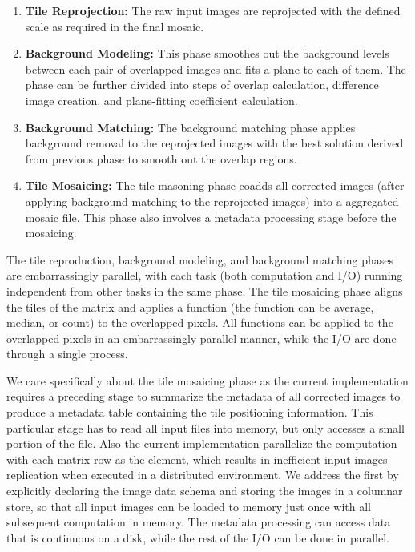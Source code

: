 \documentclass{acm_proc_article-sp}
\begin{document}
\begin{enumerate}
\item \textbf{Tile Reprojection:} The raw input images are reprojected with the defined scale as required in the
final mosaic. 
\item \textbf{Background Modeling:} This phase smoothes out the background levels between each pair of
overlapped images and fits a plane to each of them. The phase can be further divided into steps of overlap
calculation, difference image creation, and plane-fitting coefficient calculation.
\item \textbf{Background Matching:} The background matching phase applies background removal to the
reprojected images with the best solution derived from previous phase to smooth out the overlap regions.
\item \textbf{Tile Mosaicing:} The tile masoning phase coadds all corrected images (after applying background
matching to the reprojected images) into a aggregated mosaic file. This phase also involves a metadata
processing stage before the mosaicing.
\end{enumerate}

The tile reproduction, background modeling, and background matching phases are embarrassingly
parallel, with each task (both computation and I/O) running independent from other tasks in the same
phase. The tile mosaicing phase aligns the tiles of the matrix and applies a function (the function can be
average, median, or count) to the overlapped pixels. All functions can be applied to the overlapped pixels
in an embarrassingly parallel manner, while the I/O are done through a single process.

We care specifically about the tile mosaicing phase as the current implementation requires a preceding
stage to summarize the metadata of all corrected images to produce a metadata table containing the tile
positioning information. This particular stage has to read all input files into memory, but only accesses a
small portion of the file. Also the current implementation parallelize the computation with each matrix row
as the element, which results in inefficient input images replication when executed in a distributed
environment. We address the first by explicitly declaring the image data schema and storing the images
in a columnar store, so that all input images can be loaded to memory just once with all subsequent
computation in memory. The metadata processing can access data that is continuous on a disk, while the
rest of the I/O can be done in parallel.
\end{document}
